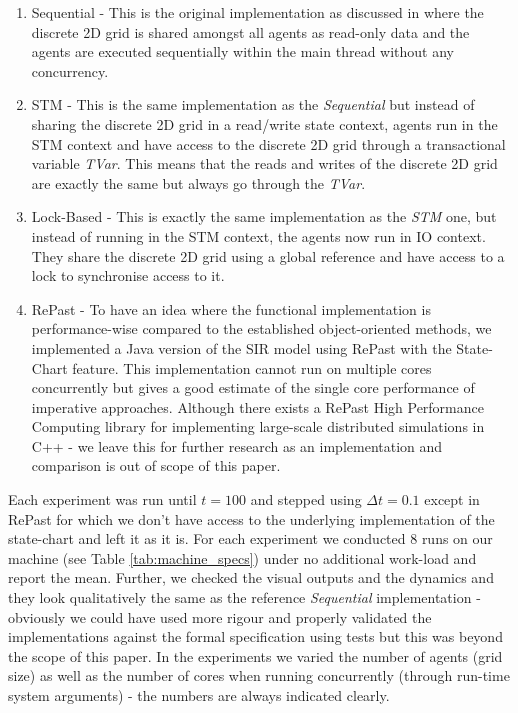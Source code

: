 \begin{enumerate}
	\item Sequential - This is the original implementation as discussed in \cite{thaler_pure_2019} where the discrete 2D grid is shared amongst all agents as read-only data and the agents are executed sequentially within the main thread without any concurrency.
	\item STM - This is the same implementation as the \textit{Sequential} but instead of sharing the discrete 2D grid in a read/write state context, agents run in the STM context and have access to the discrete 2D grid through a transactional variable \textit{TVar}. This means that the reads and writes of the discrete 2D grid are exactly the same but always go through the \textit{TVar}.
	\item Lock-Based - This is exactly the same implementation as the \textit{STM} one, but instead of running in the STM context, the agents now run in IO context. They share the discrete 2D grid using a global reference and have access to a lock to synchronise access to it.
	\item RePast - To have an idea where the functional implementation is performance-wise compared to the established object-oriented methods, we implemented a Java version of the SIR model using RePast \cite{north_complex_2013} with the State-Chart feature. This implementation cannot run on multiple cores concurrently but gives a good estimate of the single core performance of imperative approaches. Although there exists a RePast High Performance Computing library for implementing large-scale distributed simulations in C++ - we leave this for further research as an implementation and comparison is out of scope of this paper.
\end{enumerate}

Each experiment was run until $t = 100$ and stepped using $\Delta t = 0.1$ except in RePast for which we don't have access to the underlying implementation of the state-chart and left it as it is. For each experiment we conducted 8 runs on our machine (see Table \ref{tab:machine_specs}) under no additional work-load and report the mean. Further, we checked the visual outputs and the dynamics and they look qualitatively the same as the reference \textit{Sequential} implementation \cite{thaler_pure_2019} - obviously we could have used more rigour and properly validated the implementations against the formal specification using tests but this was beyond the scope of this paper. In the experiments we varied the number of agents (grid size) as well as the number of cores when running concurrently (through run-time system arguments) - the numbers are always indicated clearly. %

